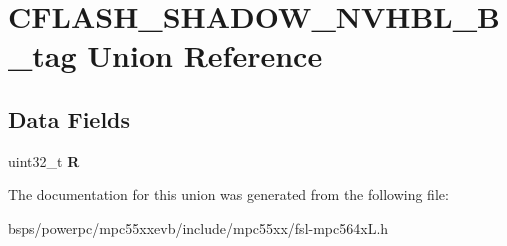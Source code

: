 \hypertarget{unionCFLASH__SHADOW__NVHBL__32B__tag}{}\section{C\+F\+L\+A\+S\+H\+\_\+\+S\+H\+A\+D\+O\+W\+\_\+\+N\+V\+H\+B\+L\+\_\+B\+\_\+tag Union Reference}
\label{unionCFLASH__SHADOW__NVHBL__32B__tag}
\subsection*{Data Fields}
\begin{DoxyCompactItemize}
\item 
\mbox{\label{unionCFLASH__SHADOW__NVHBL__32B__tag_afcbfd7e71d58827dcb6722de56e80490}} 
uint32\+\_\+t {\bfseries R}
\end{DoxyCompactItemize}


The documentation for this union was generated from the following file\+:\begin{DoxyCompactItemize}
\item 
bsps/powerpc/mpc55xxevb/include/mpc55xx/fsl-\/mpc564x\+L.\+h\end{DoxyCompactItemize}
